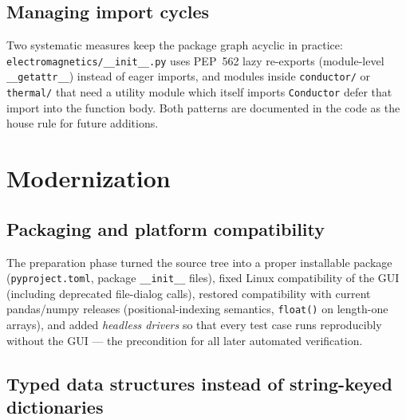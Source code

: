 \documentclass[11pt,a4paper]{article}
\newcommand{\code}[1]{\texttt{#1}}
\begin{document}
\subsection{Managing import cycles}

Two systematic measures keep the package graph acyclic in practice:
\code{electromagnetics/\_\_init\_\_.py} uses PEP~562 lazy re-exports
(module-level \code{\_\_getattr\_\_}) instead of eager imports, and modules inside
\code{conductor/} or \code{thermal/} that need a utility module which itself imports
\code{Conductor} defer that import into the function body. Both patterns are documented
in the code as the house rule for future additions.

\section{Modernization}
\label{sec:modernization}

\subsection{Packaging and platform compatibility}

The preparation phase turned the source tree into a proper installable package
(\code{pyproject.toml}, package \code{\_\_init\_\_} files), fixed Linux
compatibility of the GUI (including deprecated file-dialog calls), restored
compatibility with current pandas/numpy releases (positional-indexing semantics,
\code{float()} on length-one arrays), and added \emph{headless drivers} so that every
test case runs reproducibly without the GUI --- the precondition for all later
automated verification.

\subsection{Typed data structures instead of string-keyed dictionaries}
\end{document}
